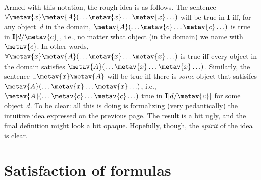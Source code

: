 Armed with this notation, the rough idea is as follows. The sentence $\forall \metav{x}\metav{A}(\ldots \metav{x} \ldots \metav{x} \ldots)$ will be true in $\mathbf{I}$ iff, for any object~$d$ in the domain, $\metav{A}(\ldots \metav{c} \ldots \metav{c}\ldots)$ is true in $\mathbf{I}[d/\metav{c}]$, i.e., no matter what object (in the domain) we name with $\metav{c}$. In other words, $\forall \metav{x} \metav{A}(\ldots \metav{x} \ldots \metav{x} \ldots)$ is true iff every object in the domain satisfies $\metav{A}(\ldots \metav{x} \ldots \metav{x} \ldots)$. Similarly, the sentence $\exists \metav{x}\metav{A}$ will be true iff there is \emph{some} object that satisifes $\metav{A}(\ldots \metav{x} \ldots \metav{x} \ldots)$, i.e., $\metav{A}(\ldots \metav{c} \ldots \metav{c} \ldots)$ true in $\mathbf{I}[d/\metav{c}]$ for some object~$d$.
To be clear: all this is doing is formalizing (very pedantically) the intuitive idea expressed on the previous page. The result is a bit ugly, and the final definition might look a bit opaque. Hopefully, though, the \emph{spirit} of the idea is clear.

\section{Satisfaction of formulas}

